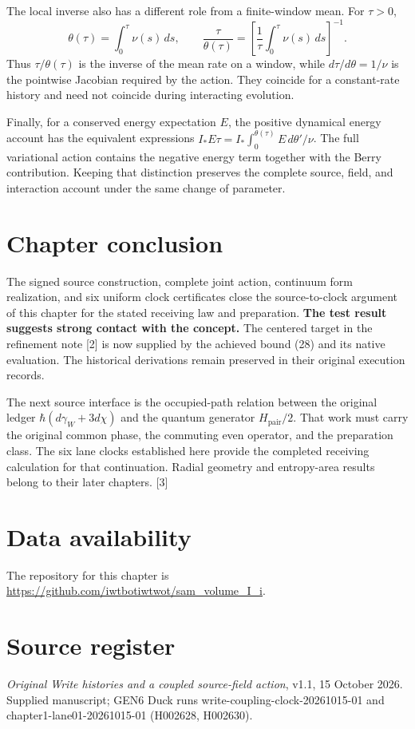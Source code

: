 \documentclass[10pt,twocolumn,letterpaper]{article}
\begin{document}
The local inverse also has a different role from a finite-window mean. For $\tau>0$,
\[
\theta(\tau)=\int_0^\tau\nu(s)\,ds,
\qquad
\frac{\tau}{\theta(\tau)}
=\left[\frac1\tau\int_0^\tau\nu(s)\,ds\right]^{-1}.
\]
Thus $\tau/\theta(\tau)$ is the inverse of the mean rate on a window, while $d\tau/d\theta=1/\nu$ is the pointwise Jacobian required by the action. They coincide for a constant-rate history and need not coincide during interacting evolution.

Finally, for a conserved energy expectation $E$, the positive dynamical energy account has the equivalent expressions $I_*E\tau=I_*\int_0^{\theta(\tau)}E\,d\theta'/\nu$. The full variational action contains the negative energy term together with the Berry contribution. Keeping that distinction preserves the complete source, field, and interaction account under the same change of parameter.


\section{Chapter conclusion}
The signed source construction, complete joint action, continuum form realization, and six uniform clock certificates close the source-to-clock argument of this chapter for the stated receiving law and preparation. \textbf{The test result suggests strong contact with the concept.} The centered target in the refinement note [2] is now supplied by the achieved bound (28) and its native evaluation. The historical derivations remain preserved in their original execution records.

The next source interface is the occupied-path relation between the original ledger $\hbar(d\gamma_W+3d\chi)$ and the quantum generator $H_{\mathrm{pair}}/2$. That work must carry the original common phase, the commuting even operator, and the preparation class. The six lane clocks established here provide the completed receiving calculation for that continuation. Radial geometry and entropy-area results belong to their later chapters. [3]


\section*{Data availability}
The repository for this chapter is \url{https://github.com/iwtbotiwtwot/sam_volume_I_i}.

\section*{Source register}
\begingroup\footnotesize
\noindent[1] \emph{Original Write histories and a coupled source-field action}, v1.1, 15 October 2026. Supplied manuscript; GEN6 Duck runs write-coupling-clock-20261015-01 and chapter1-lane01-20261015-01 (H002628, H002630).
\end{document}
